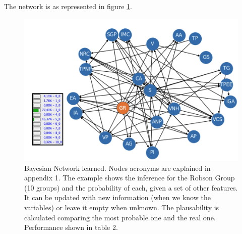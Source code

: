 The network is as represented in figure \ref{fig:network}.
\begin{figure}[htbp]
\centering
\caption{Bayesian Network learned. Nodes acronyms are explained in appendix 1. The example shows the inference for the Robson Group (10 groups) and the probability of each, given a set of other features. It can be updated with new information (when we know the variables) or leave it empty when unknown. The plausability is calculated comparing the most probable one and the real one. Performance shown in table 2.}\label{fig:network} 
\includegraphics[scale=0.38]{imgs/new-bn.png}
\end{figure}






